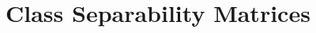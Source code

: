 \documentclass[jimaging,article,accept,pdftex,oneauthor]{Definitions/mdpi}
\begin{document}
\appendixstart
\appendix
\section[\appendixname~\thesection]{Class %
 Separability Matrices}\label{secMatr}
\vspace{-12pt}
\end{document}
